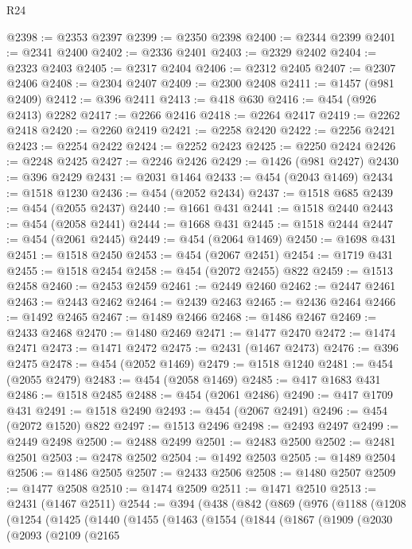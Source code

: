 \begin{lexlean}{R24}
\begin{coremodule}
@2398 := @2353 @2397
@2399 := @2350 @2398
@2400 := @2344 @2399
@2401 := @2341 @2400
@2402 := @2336 @2401
@2403 := @2329 @2402
@2404 := @2323 @2403
@2405 := @2317 @2404
@2406 := @2312 @2405
@2407 := @2307 @2406
@2408 := @2304 @2407
@2409 := @2300 @2408
@2411 := @1457 (@981 @2409)
@2412 := @396 @2411
@2413 := @418 @630
@2416 := @454 (@926 @2413) @2282
@2417 := @2266 @2416
@2418 := @2264 @2417
@2419 := @2262 @2418
@2420 := @2260 @2419
@2421 := @2258 @2420
@2422 := @2256 @2421
@2423 := @2254 @2422
@2424 := @2252 @2423
@2425 := @2250 @2424
@2426 := @2248 @2425
@2427 := @2246 @2426
@2429 := @1426 (@981 @2427)
@2430 := @396 @2429
@2431 := @2031 @1464
@2433 := @454 (@2043 @1469)
@2434 := @1518 @1230
@2436 := @454 (@2052 @2434)
@2437 := @1518 @685
@2439 := @454 (@2055 @2437)
@2440 := @1661 @431
@2441 := @1518 @2440
@2443 := @454 (@2058 @2441)
@2444 := @1668 @431
@2445 := @1518 @2444
@2447 := @454 (@2061 @2445)
@2449 := @454 (@2064 @1469)
@2450 := @1698 @431
@2451 := @1518 @2450
@2453 := @454 (@2067 @2451)
@2454 := @1719 @431
@2455 := @1518 @2454
@2458 := @454 (@2072 @2455) @822
@2459 := @1513 @2458
@2460 := @2453 @2459
@2461 := @2449 @2460
@2462 := @2447 @2461
@2463 := @2443 @2462
@2464 := @2439 @2463
@2465 := @2436 @2464
@2466 := @1492 @2465
@2467 := @1489 @2466
@2468 := @1486 @2467
@2469 := @2433 @2468
@2470 := @1480 @2469
@2471 := @1477 @2470
@2472 := @1474 @2471
@2473 := @1471 @2472
@2475 := @2431 (@1467 @2473)
@2476 := @396 @2475
@2478 := @454 (@2052 @1469)
@2479 := @1518 @1240
@2481 := @454 (@2055 @2479)
@2483 := @454 (@2058 @1469)
@2485 := @417 @1683 @431
@2486 := @1518 @2485
@2488 := @454 (@2061 @2486)
@2490 := @417 @1709 @431
@2491 := @1518 @2490
@2493 := @454 (@2067 @2491)
@2496 := @454 (@2072 @1520) @822
@2497 := @1513 @2496
@2498 := @2493 @2497
@2499 := @2449 @2498
@2500 := @2488 @2499
@2501 := @2483 @2500
@2502 := @2481 @2501
@2503 := @2478 @2502
@2504 := @1492 @2503
@2505 := @1489 @2504
@2506 := @1486 @2505
@2507 := @2433 @2506
@2508 := @1480 @2507
@2509 := @1477 @2508
@2510 := @1474 @2509
@2511 := @1471 @2510
@2513 := @2431 (@1467 @2511)
@2544 := @394
    (@438
      (@842
        (@869
          (@976
            (@1188
              (@1208
                (@1254
                  (@1425
                    (@1440
                      (@1455
                        (@1463
                          (@1554
                            (@1844
                              (@1867
                                (@1909
                                  (@2030
                                    (@2093
                                      (@2109
                                        (@2165

\end{coremodule}
\end{lexlean}
